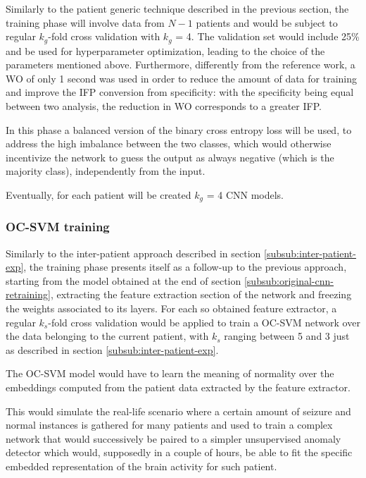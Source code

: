Similarly to the patient generic technique described in the previous section, the training phase will involve data from $N-1$ patients and would be subject to regular $k_g$-fold cross validation with $k_g$ = 4. The validation set would include 25\% and be used for hyperparameter optimization, leading to the choice of the parameters mentioned above. Furthermore, differently from the reference work, a \gls{WO} of only 1 second was used in order to reduce the amount of data for training and improve the \gls{IFP} conversion from specificity: with the specificity being equal between two analysis, the reduction in \gls{WO} corresponds to a greater \gls{IFP}.

In this phase a balanced version of the binary cross entropy loss will be used, to address the high imbalance between the two classes, which would otherwise incentivize the network to guess the output as always negative (which is the majority class), independently from the input.

Eventually, for each patient will be created $k_g$ = 4 \gls{CNN} models.

\subsubsection{OC-SVM training}
Similarly to the inter-patient approach described in section \ref{subsub:inter-patient-exp}, the training phase presents itself as a follow-up to the previous approach, starting from the model obtained at the end of section  \ref{subsub:original-cnn-retraining}, extracting the feature extraction section of the network and freezing the weights associated to its layers. For each so obtained feature extractor, a regular $k_s$-fold cross validation would be applied to train a \gls{OC-SVM} network over the data belonging to the current patient, with $k_s$ ranging between 5 and 3 just as described in section \ref{subsub:inter-patient-exp}.

The \gls{OC-SVM} model would have to learn the meaning of normality over the embeddings computed from the patient data extracted by the feature extractor.

This would simulate the real-life scenario where a certain amount of seizure and normal instances is gathered for many patients and used to train a complex network that would successively be paired to a simpler unsupervised anomaly detector which would, supposedly in a couple of hours, be able to fit the specific embedded representation of the brain activity for such patient. 

